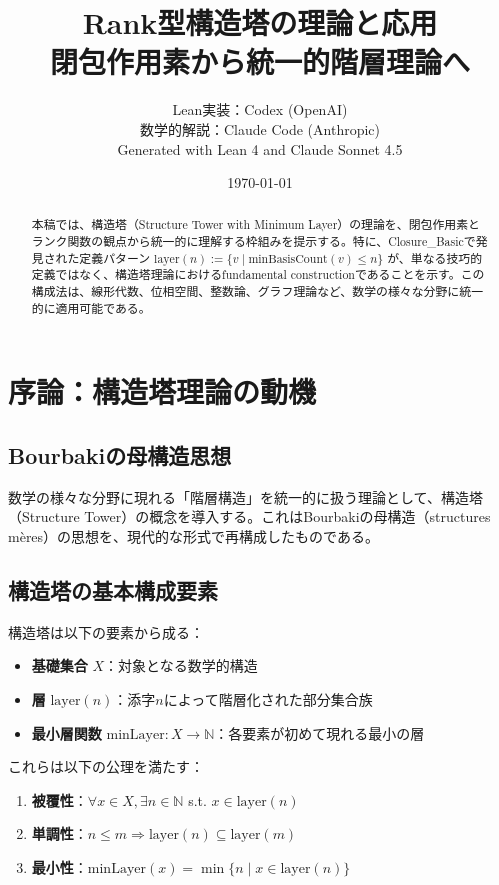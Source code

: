 \documentclass[a4paper,12pt]{ltjsarticle}
\title{Rank型構造塔の理論と応用\\{\large 閉包作用素から統一的階層理論へ}}
\author{Lean実装：Codex (OpenAI)\\
数学的解説：Claude Code (Anthropic)\\
\small Generated with Lean 4 and Claude Sonnet 4.5}
\date{\today}
\theoremstyle{definition}
\begin{document}
\maketitle

\begin{abstract}
本稿では、構造塔（Structure Tower with Minimum Layer）の理論を、閉包作用素とランク関数の観点から統一的に理解する枠組みを提示する。特に、Closure\_Basicで発見された定義パターン $\text{layer}(n) := \{v \mid \text{minBasisCount}(v) \leq n\}$ が、単なる技巧的定義ではなく、構造塔理論におけるfundamental constructionであることを示す。この構成法は、線形代数、位相空間、整数論、グラフ理論など、数学の様々な分野に統一的に適用可能である。
\end{abstract}

\tableofcontents

\section{序論：構造塔理論の動機}

\subsection{Bourbakiの母構造思想}

数学の様々な分野に現れる「階層構造」を統一的に扱う理論として、構造塔（Structure Tower）の概念を導入する。これはBourbakiの母構造（structures mères）の思想を、現代的な形式で再構成したものである。

\subsection{構造塔の基本構成要素}

構造塔は以下の要素から成る：
\begin{itemize}
\item \textbf{基礎集合} $X$：対象となる数学的構造
\item \textbf{層} $\text{layer}(n)$：添字$n$によって階層化された部分集合族
\item \textbf{最小層関数} $\text{minLayer}: X \to \mathbb{N}$：各要素が初めて現れる最小の層
\end{itemize}

これらは以下の公理を満たす：
\begin{enumerate}
\item \textbf{被覆性}：$\forall x \in X, \exists n \in \mathbb{N}$ s.t. $x \in \text{layer}(n)$
\item \textbf{単調性}：$n \leq m \Rightarrow \text{layer}(n) \subseteq \text{layer}(m)$
\item \textbf{最小性}：$\text{minLayer}(x) = \min\{n \mid x \in \text{layer}(n)\}$
\end{enumerate}
\end{document}
